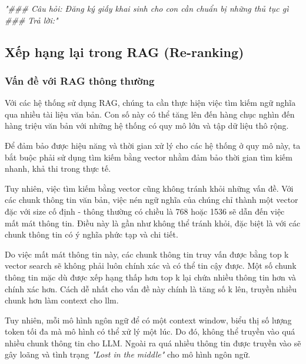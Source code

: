 \documentclass[a4paper, 12pt, openany]{book}
\begin{document}
\begin{center}
    \textit{"\#\#\# Câu hỏi: {Đăng ký giấy khai sinh cho con cần chuẩn bị những thủ tục gì} \\ \#\#\# Trả lời:"}
\end{center}



\subsection{Xếp hạng lại trong RAG (Re-ranking)}

\subsubsection{Vấn đề với RAG thông thường}
Với các hệ thống sử dụng RAG, chúng ta cần thực hiện việc tìm kiếm ngữ nghĩa qua nhiều tài liệu văn bản.
Con số này có thể  tăng lên đến hàng chục nghìn đến hàng triệu văn bản với những hệ thống có quy mô lớn và tập dữ liệu thô rộng.

Để đảm bảo được hiệu năng và thời gian xử lý cho các hệ thống ở quy mô này, ta bắt buộc phải sử dụng tìm kiếm bằng vector
nhằm đảm bảo thời gian tìm kiếm nhanh, khả thi trong thực tế.

Tuy nhiên, việc tìm kiếm bằng vector cũng không tránh khỏi những vấn đề. Với các chunk thông tin văn bản,
việc nén ngữ nghĩa của chúng chỉ thành một vector đặc với size cố định - thông thường có chiều là 768 hoặc 1536 sẽ dẫn đến việc mất mát thông tin.
Điều này là gần như không thể tránh khỏi, đặc biệt là với các chunk thông tin có ý nghĩa phức tạp và chi tiết.

Do việc mất mát thông tin này, các chunk thông tin truy vấn được bằng top k vector search sẽ không phải luôn chính xác và có thể tin cậy được.
Một số chunk thông tin mặc dù được xếp hạng thấp hơn top k lại chứa nhiều thông tin hơn và chính xác hơn.
Cách dễ nhất cho vấn đề này chính là tăng số k lên, truyền nhiều chunk hơn làm context cho \ac{llm}.

Tuy nhiên, mỗi mô hình ngôn ngữ để có một context window, biểu thị số lượng token tối đa mà mô hình có thể xử lý một lúc. Do đó, không thể truyền vào quá nhiều chunk thông tin cho LLM.
Ngoài ra quá nhiều thông tin được truyền vào sẽ gây loãng và tình trạng \textit{"Lost in the middle"} cho mô hình ngôn ngữ.
\end{document}
